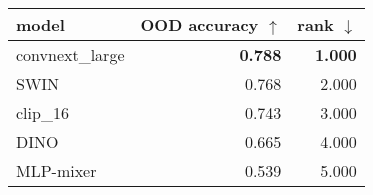 \begin{tabular}{lrr}
\toprule
          model & OOD accuracy $\uparrow$ & rank $\downarrow$ \\
\midrule
convnext\_large &          \textbf{0.788} &    \textbf{1.000} \\
           SWIN &                   0.768 &             2.000 \\
       clip\_16 &                   0.743 &             3.000 \\
           DINO &                   0.665 &             4.000 \\
      MLP-mixer &                   0.539 &             5.000 \\
\bottomrule
\end{tabular}

